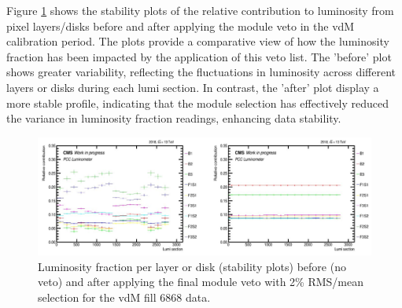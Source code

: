Figure \ref{fig:b_a_stability_vdm} shows the stability plots of the relative contribution to luminosity from pixel layers/disks before and after applying the module veto in the vdM calibration period. %
The plots provide a comparative view of how the luminosity fraction has been impacted by the application of this veto list. The 'before' plot shows greater variability, reflecting the fluctuations in luminosity across different layers or disks  during each lumi section. In contrast, the 'after' plot  display a more stable profile, indicating that the module selection has effectively reduced the variance in luminosity fraction readings, enhancing data stability. %

\begin{figure}[!htp]
\centering
\includegraphics[width=1\textwidth]{ashish_thesis/before_after_vdm_stability_1.png}
\caption[PCC vdM stability]{%
   Luminosity fraction per layer or disk (stability plots) before (no veto) and after applying the final module veto with 2\% RMS/mean selection for the vdM fill 6868 data.
}
\label{fig:b_a_stability_vdm}
\end{figure}


